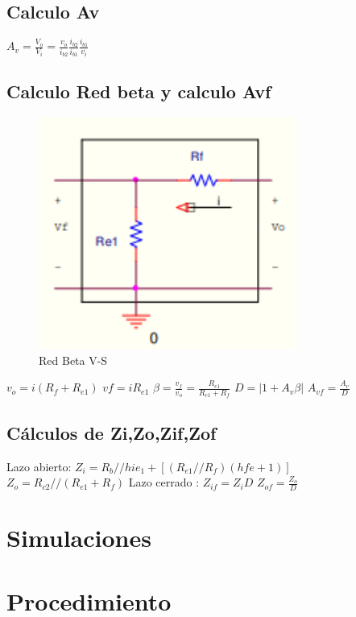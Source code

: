 \documentclass[12pt, letterpaper]{article}
\begin{document}
\subsection{Calculo Av}
$A_v=\frac{V_o}{V_i}=\frac{v_o}{i_{b2}}\frac{i_{b2}}{i_{b1}}\frac{i_{b1}}{v_i}$
\subsection{Calculo Red beta y calculo Avf}
\begin{figure}[h]
	\centering
	\includegraphics[width=0.75\textwidth]{Imagenes/Screenshot_58.png}
	\caption{Red Beta  V-S}
	\label{fig:2.2.1}
\end{figure}
\singlespacing
$v_o=i(R_f+R_{e1})$ \hspace{1cm} $vf=iR_{e1}$
\singlespacing
$\beta = \frac{v_f}{v_o}=\frac{R_{e1}}{R_{e1}+R_f}$
\singlespacing
$D=|1+A_v\beta|$ \hspace{1cm} $A_{vf}=\frac{A_v}{D}$
\subsection{Cálculos de Zi,Zo,Zif,Zof}
Lazo abierto:
$Z_i=R_b//{hie_1+[(R_{e1}//R_f)(hfe+1)]}$
\singlespacing
$Z_o=R_{c2}//(R_{e1}+R_f)$
\singlespacing
Lazo cerrado :
$Z_{if}=Z_iD$
\singlespacing
$Z_{of}=\frac{Z_o}{D}$
\section{Simulaciones}

\section{Procedimiento}
\end{document}
